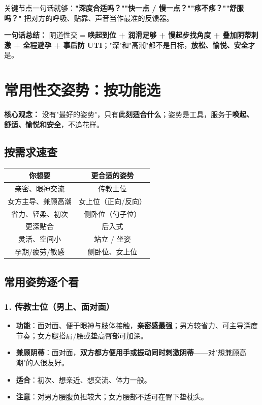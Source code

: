 关键节点一句话就够：\textbf{"深度合适吗？""快一点 / 慢一点？""疼不疼？""舒服吗？"} 把对方的呼吸、贴靠、声音当作最准的反馈器。

\vspace{1em}
\noindent\textbf{一句话总结：} 阴道性交 = \textbf{唤起到位 + 润滑足够 + 慢起步找角度 + 叠加阴蒂刺激 + 全程避孕 + 事后防 UTI}；"深"和"高潮"都不是目标，\textbf{放松、愉悦、安全}才是。

\chapter{常用性交姿势：按功能选}
\label{chap:positions}

\noindent\textbf{核心观念：} 没有"最好的姿势"，只有\textbf{此刻适合什么}；姿势是工具，服务于\textbf{唤起、舒适、愉悦和安全}，不追花样。

\section{按需求速查}

\begin{tabularx}{\textwidth}{C C}
\toprule
你想要 & 更合适的姿势 \\
\midrule
亲密、眼神交流 & 传教士位 \\
女方主导、兼顾高潮 & 女上位（正向/反向） \\
省力、轻柔、初次 & 侧卧位（勺子位） \\
更深贴合 & 后入式 \\
灵活、空间小 & 站立 / 坐姿 \\
孕期/疲劳/敏感 & 侧卧位、女上位 \\
\bottomrule
\end{tabularx}

\section{常用姿势逐个看}

\subsection*{1. 传教士位（男上、面对面）}
\begin{itemize}[leftmargin=2em,itemsep=0.3em]
  \item \textbf{功能}：面对面、便于眼神与肢体接触，\textbf{亲密感最强}；男方较省力、可主导深度节奏；女方腿搭肩/腰或垫高臀部可加深。
  \item \textbf{兼顾阴蒂}：面对面，\textbf{双方都方便用手或振动同时刺激阴蒂}——对"想兼顾高潮"的人很友好。
  \item \textbf{适合}：初次、想亲近、想交流、体力一般。
  \item \textbf{注意}：对男方腰腹负担较大；女方腰部不适可在臀下垫枕头。
\end{itemize}

